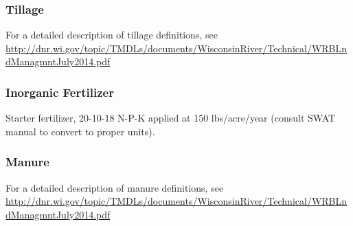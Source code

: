 \subsubsection{Tillage}
For a detailed description of tillage definitions, see \href{http://dnr.wi.gov/topic/TMDLs/documents/WisconsinRiver/Technical/WRBLndManagmntJuly2014.pdf}{http://dnr.wi.gov/topic/TMDLs/documents/WisconsinRiver/Technical/WRBLndManagmntJuly2014.pdf}
\subsubsection{Inorganic Fertilizer}
Starter fertilizer, 20-10-18 N-P-K applied at 150 lbs/acre/year (consult SWAT manual to convert to proper units).
\subsubsection{Manure}
For a detailed description of manure definitions, see \href{http://dnr.wi.gov/topic/TMDLs/documents/WisconsinRiver/Technical/WRBLndManagmntJuly2014.pdf}{http://dnr.wi.gov/topic/TMDLs/documents/WisconsinRiver/Technical/WRBLndManagmntJuly2014.pdf}